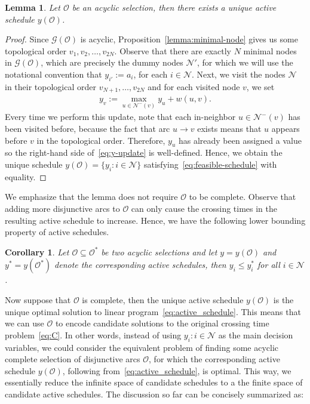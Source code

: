 \documentclass[a4paper]{report}
\theoremstyle{definition}
\theoremstyle{plain}
\newtheorem{lemma}{Lemma}[chapter]
\newtheorem{corollary}{Corollary}[chapter]
\begin{document}
\begin{lemma}\label{lemma:unique-active-schedule}
  Let $\mathcal{O}$ be an acyclic selection, then there exists a unique active
  schedule $y(\mathcal{O})$.
\end{lemma}
\begin{proof}
  Since $\mathcal{G}(\mathcal{O})$ is acyclic, Proposition~\ref{lemma:minimal-node} gives us
  some topological order $v_1, v_2, \dots, v_{2N}$.
  Observe that there are exactly $N$ minimal nodes in
  $\mathcal{G}(\mathcal{O})$, which are precisely the dummy nodes
  $\mathcal{N}'$, for which we will use the notational convention that
  $y_{i'} := a_i$, for each $i \in \mathcal{N}$.
  Next, we visit the nodes $\mathcal{N}$ in their topological order
  $v_{N+1}, \dots, v_{2N}$ and for each visited node $v$, we set
  \begin{align}
    \label{eq:y-update}
   y_{v} := \max_{u \in \mathcal{N}^-(v)} y_{u} + w(u,v) .
  \end{align}
  Every time we perform this update, note that each in-neighbor
  $u \in \mathcal{N}^-(v)$ has been visited before, because the fact that arc
  $u \rightarrow v$ exists means that $u$ appears before $v$ in the topological order.
  Therefore, $y_{u}$ has already been assigned a value so the right-hand side
  of~\eqref{eq:y-update} is well-defined. Hence, we obtain the unique schedule
  $y(\mathcal{O}) = \{ y_i : i \in \mathcal{N} \}$ satisfying~\eqref{eq:feasible-schedule} with equality.
\end{proof}

We emphasize that the lemma does not require $\mathcal{O}$ to be complete.
Observe that adding more disjunctive arcs to $\mathcal{O}$ can only cause the
crossing times in the resulting active schedule to increase. Hence, we have the
following lower bounding property of active schedules.
%
\begin{corollary}
  \label{lower-bounds}
  Let $\mathcal{O} \subseteq \mathcal{O}^*$ be two acyclic selections and let
  $y = y(\mathcal{O})$ and $y^* = y(\mathcal{O}^{*})$ denote the corresponding
  active schedules, then $y_i \leq y^{*}_i$ for all $i \in \mathcal{N}$.
\end{corollary}


Now suppose that $\mathcal{O}$ is complete, then the unique active schedule
$y(\mathcal{O})$ is the unique optimal solution to linear program~\eqref{eq:active_schedule}.
%
This means that we can use $\mathcal{O}$ to encode candidate solutions to the
original crossing time problem~\eqref{eq:C}.
%
In other words, instead of using $y_i : i \in \mathcal{N}$ as the main decision
variables, we could consider the equivalent problem of finding some acyclic
complete selection of disjunctive arcs $\mathcal{O}$, for which the
corresponding active schedule $y(\mathcal{O})$, following from~\eqref{eq:active_schedule}, is optimal.
%
This way, we essentially reduce the infinite space of candidate schedules to a
the finite space of candidate active schedules.
%
The discussion so far can be concisely summarized as:
\end{document}

